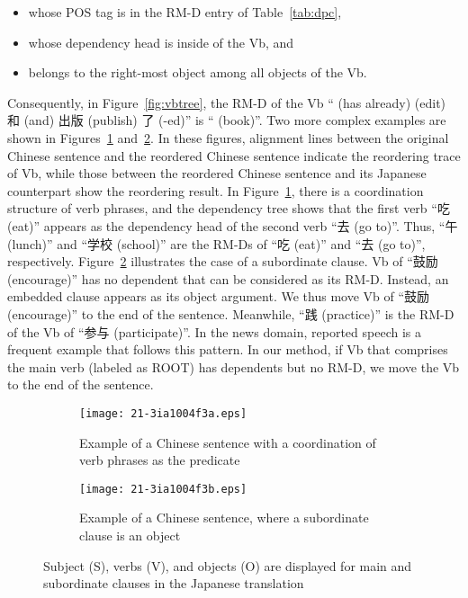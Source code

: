 \documentclass[english]{jnlp_1.4}
\begin{document}
\begin{itemize}
\item whose POS tag is in the RM-D entry of Table~\ref{tab:dpc},
\item whose dependency head is inside of the Vb, and
\item belongs to the right-most object among all objects of the Vb.
\end{itemize}

Consequently, in Figure~\ref{fig:vbtree}, the RM-D of the Vb `` (has already) 
 (edit) 和 (and) 出版 (publish) 了 (-ed)'' is `` (book)''. Two more complex 
examples are shown in Figures~\ref{fig:rmdb} and~\ref{fig:rmda}. In these
figures, alignment lines between the original Chinese sentence and the reordered 
Chinese sentence indicate the reordering trace of Vb, while those 
between the reordered Chinese sentence and its Japanese counterpart show the reordering result.
In Figure~\ref{fig:rmdb}, there is a coordination structure of verb phrases, and 
the dependency tree shows that the first verb ``吃 (eat)'' appears as the dependency 
head of the second verb ``去 (go to)''. Thus, ``午 (lunch)'' and ``学校 (school)'' are 
the RM-Ds of ``吃 (eat)'' and ``去 (go to)'', respectively.
Figure~\ref{fig:rmda} illustrates the case of a subordinate clause. Vb of 
``鼓励 (encourage)'' has no dependent that can be considered as its RM-D. Instead, 
an embedded clause appears as its object argument. We thus move Vb of 
``鼓励 (encourage)'' to the end of the sentence. Meanwhile, ``践 (practice)'' 
is the RM-D of the Vb of ``参与 (participate)''. In the news domain, reported 
speech is a frequent example that follows this pattern. In our method, if
Vb that comprises the main verb (labeled as ROOT) has dependents but no 
RM-D, we move the Vb to the end of the sentence. 

\begin{figure}[p]
\begin{subfigure}{1\textwidth}
\begin{center}
\texttt{[image: 21-3ia1004f3a.eps]}
\end{center}
\caption{Example of a Chinese sentence with a coordination of verb phrases as the predicate}
\label{fig:rmdb}
\end{subfigure}
\vspace{0.5\Cvs}

\begin{subfigure}{1\textwidth}
\begin{center}
\texttt{[image: 21-3ia1004f3b.eps]}
\end{center}
\caption{Example of a Chinese sentence, where a subordinate clause is an object}
\label{fig:rmda}
\end{subfigure}
\caption{Subject (S), verbs (V), and objects (O) are displayed for main and subordinate 
clauses in the Japanese translation} 
\label{fig:rmd}
\end{figure}
\end{document}
